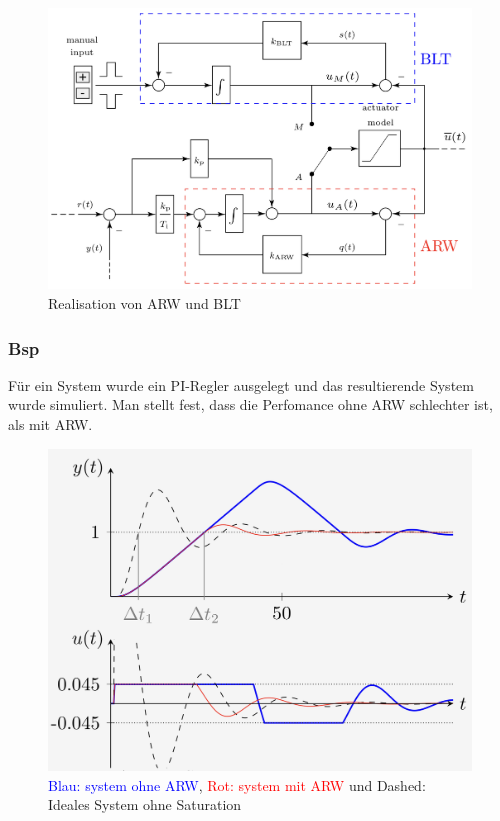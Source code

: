         \begin{figure}[H]
            \centering
            \includegraphics[width = 0.6\linewidth]{images/04/arw_bt.jpeg}
            \caption{Realisation von ARW und BLT}
        \end{figure}
        
    \subsubsection{Bsp}
        Für ein System wurde ein PI-Regler ausgelegt und das resultierende System wurde simuliert. Man stellt fest, dass die Perfomance ohne ARW schlechter ist, als mit ARW.
        
        \begin{figure}[H]
            \centering
            \includegraphics[width = 0.6\linewidth]{images/04/arw_bsp.jpeg}
            \caption{\textcolor{blue}{Blau: system ohne ARW}, \textcolor{red}{Rot: system mit ARW} und Dashed: Ideales System ohne Saturation}
        \end{figure}